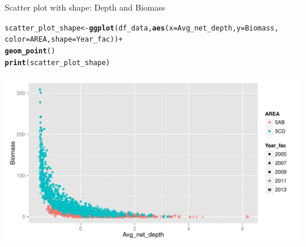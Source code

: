 \documentclass{beamer}\usepackage[]{graphicx}\usepackage[]{color}
\makeatletter
\newcommand{\hlopt}[1]{\textcolor[rgb]{0,0,0}{#1}}%
\newcommand{\hlstd}[1]{\textcolor[rgb]{0.345,0.345,0.345}{#1}}%
\newcommand{\hlkwb}[1]{\textcolor[rgb]{0.69,0.353,0.396}{#1}}%
\newcommand{\hlkwc}[1]{\textcolor[rgb]{0.333,0.667,0.333}{#1}}%
\newcommand{\hlkwd}[1]{\textcolor[rgb]{0.737,0.353,0.396}{\textbf{#1}}}%
\newenvironment{kframe}{%
 \def\at@end@of@kframe{}%
 \ifinner\ifhmode%
  \def\at@end@of@kframe{\end{minipage}}%
  \begin{minipage}{\columnwidth}%
 \fi\fi%
 \def\FrameCommand##1{\hskip\@totalleftmargin \hskip-\fboxsep
 \colorbox{shadecolor}{##1}\hskip-\fboxsep
     \hskip-\linewidth \hskip-\@totalleftmargin \hskip\columnwidth}%
 \MakeFramed {\advance\hsize-\width
   \@totalleftmargin\z@ \linewidth\hsize
   \@setminipage}}%
 {\par\unskip\endMakeFramed%
 \at@end@of@kframe}
\newenvironment{knitrout}{}{} %
\makeatother
\begin{document}
\begin{frame}[fragile]{Scatter plot with shape: Depth and Biomass}
\begin{knitrout}\footnotesize
{}\color{fgcolor}\begin{kframe}
\begin{alltt}
  \hlstd{scatter_plot_shape} \hlkwb{<-} \hlkwd{ggplot}\hlstd{(df_data,} \hlkwd{aes}\hlstd{(}\hlkwc{x}\hlstd{=Avg_net_depth,} \hlkwc{y}\hlstd{=Biomass,}
                                         \hlkwc{color}\hlstd{=AREA,} \hlkwc{shape}\hlstd{=Year_fac))} \hlopt{+}
  \hlkwd{geom_point}\hlstd{()}
  \hlkwd{print}\hlstd{(scatter_plot_shape)}
\end{alltt}
\end{kframe}

{\centering \includegraphics[width=.9\linewidth]{figure/scatter_plot_shape-1} 

}



\end{knitrout}
\end{frame}
\end{document}
